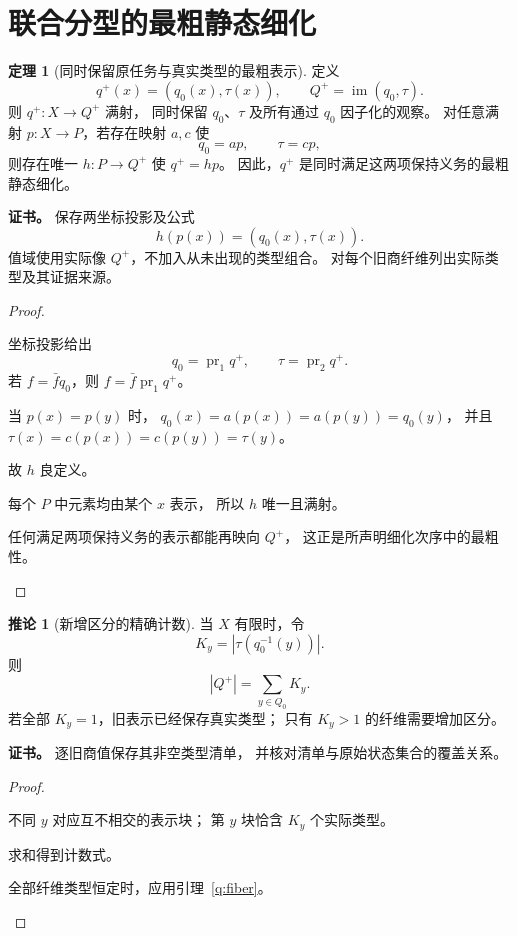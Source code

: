 \documentclass[UTF8,12pt,a4paper,openany,fontset=none,zihao=false]{ctexrep}
\theoremstyle{definition}
\newtheorem{theorem}{定理}[chapter]
\newtheorem{corollary}{推论}[chapter]
\newenvironment{certificate}{\par\noindent\textbf{证书。}\ignorespaces}{\par}
\newcommand{\1}{\mathbf 1}
\begin{document}
\section{联合分型的最粗静态细化}
\begin{theorem}[同时保留原任务与真实类型的最粗表示]
\label{q:joint}
定义
\[
q^+(x)=(q_0(x),\tau(x)),\qquad
Q^+=\operatorname{im}(q_0,\tau).
\]
则 \(q^+:X\to Q^+\) 满射，
同时保留 \(q_0\)、\(\tau\) 及所有通过 \(q_0\) 因子化的观察。
对任意满射 \(p:X\to P\)，若存在映射 \(a,c\) 使
\[
q_0=ap,\qquad \tau=cp,
\]
则存在唯一 \(h:P\to Q^+\) 使 \(q^+=hp\)。
因此，\(q^+\) 是同时满足这两项保持义务的最粗静态细化。
\end{theorem}
\begin{certificate}
保存两坐标投影及公式
\[
h(p(x))=(q_0(x),\tau(x)).
\]
值域使用实际像 \(Q^+\)，不加入从未出现的类型组合。
对每个旧商纤维列出实际类型及其证据来源。
\end{certificate}
\begin{proof}
\begin{semanticsteps}
\item 坐标投影给出
\[
q_0=\operatorname{pr}_1q^+,\qquad
\tau=\operatorname{pr}_2q^+.
\]
若 \(f=\bar f q_0\)，则
\(f=\bar f\operatorname{pr}_1q^+\)。
\item 当 \(p(x)=p(y)\) 时，
\(q_0(x)=a(p(x))=a(p(y))=q_0(y)\)，
并且 \(\tau(x)=c(p(x))=c(p(y))=\tau(y)\)。
\item 故 \(h\) 良定义。
\item 每个 \(P\) 中元素均由某个 \(x\) 表示，
所以 \(h\) 唯一且满射。
\item 任何满足两项保持义务的表示都能再映向 \(Q^+\)，
这正是所声明细化次序中的最粗性。
\end{semanticsteps}
\end{proof}
\begin{corollary}[新增区分的精确计数]
\label{q:count}
当 \(X\) 有限时，令
\[
K_y=\left|\tau(q_0^{-1}(y))\right|.
\]
则
\[
|Q^+|=\sum_{y\in Q_0}K_y.
\]
若全部 \(K_y=1\)，旧表示已经保存真实类型；
只有 \(K_y>1\) 的纤维需要增加区分。
\end{corollary}
\begin{certificate}
逐旧商值保存其非空类型清单，
并核对清单与原始状态集合的覆盖关系。
\end{certificate}
\begin{proof}
\begin{semanticsteps}
\item 不同 \(y\) 对应互不相交的表示块；
第 \(y\) 块恰含 \(K_y\) 个实际类型。
\item 求和得到计数式。
\item 全部纤维类型恒定时，应用引理~\ref{q:fiber}。
\end{semanticsteps}
\end{proof}
\end{document}
